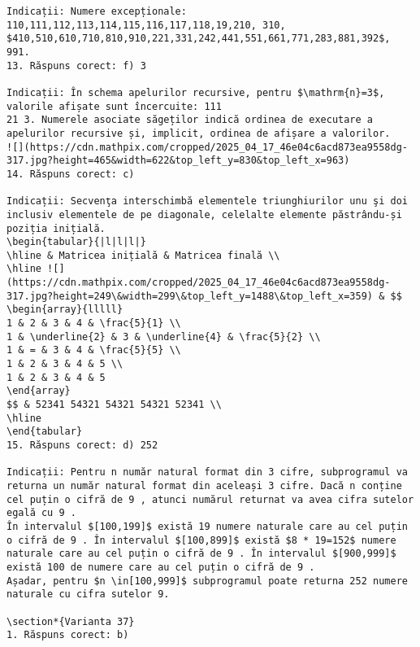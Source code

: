 \begin{verbatim}
Indicații: Numere excepționale: 110,111,112,113,114,115,116,117,118,19,210, 310, $410,510,610,710,810,910,221,331,242,441,551,661,771,283,881,392$, 991.
13. Răspuns corect: f) 3

Indicații: În schema apelurilor recursive, pentru $\mathrm{n}=3$, valorile afișate sunt încercuite: 111
21 3. Numerele asociate săgeților indică ordinea de executare a apelurilor recursive și, implicit, ordinea de afișare a valorilor.
![](https://cdn.mathpix.com/cropped/2025_04_17_46e04c6acd873ea9558dg-317.jpg?height=465&width=622&top_left_y=830&top_left_x=963)
14. Răspuns corect: c)

Indicații: Secvenţa interschimbă elementele triunghiurilor unu şi doi inclusiv elementele de pe diagonale, celelalte elemente păstrându-și poziția inițială.
\begin{tabular}{|l|l|l|}
\hline & Matricea inițială & Matricea finală \\
\hline ![](https://cdn.mathpix.com/cropped/2025_04_17_46e04c6acd873ea9558dg-317.jpg?height=249\&width=299\&top_left_y=1488\&top_left_x=359) & $$
\begin{array}{lllll}
1 & 2 & 3 & 4 & \frac{5}{1} \\
1 & \underline{2} & 3 & \underline{4} & \frac{5}{2} \\
1 & = & 3 & 4 & \frac{5}{5} \\
1 & 2 & 3 & 4 & 5 \\
1 & 2 & 3 & 4 & 5
\end{array}
$$ & 52341 54321 54321 54321 52341 \\
\hline
\end{tabular}
15. Răspuns corect: d) 252

Indicații: Pentru n număr natural format din 3 cifre, subprogramul va returna un număr natural format din aceleași 3 cifre. Dacă n conține cel puțin o cifră de 9 , atunci numărul returnat va avea cifra sutelor egală cu 9 .
În intervalul $[100,199]$ există 19 numere naturale care au cel puțin o cifră de 9 . În intervalul $[100,899]$ există $8 * 19=152$ numere naturale care au cel puțin o cifră de 9 . În intervalul $[900,999]$ există 100 de numere care au cel puțin o cifră de 9 .
Așadar, pentru $n \in[100,999]$ subprogramul poate returna 252 numere naturale cu cifra sutelor 9.

\section*{Varianta 37}
1. Răspuns corect: b)


\end{verbatim}
